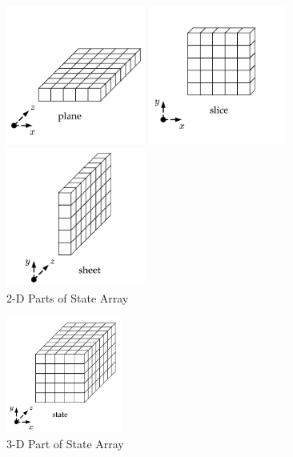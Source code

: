 \documentclass[12pt,a4paper,oneside]{report}
\begin{document}
\begin{figure}[H]
\begin{minipage}[t]{0.3\linewidth} 
\centering 
\includegraphics[width=1.8in]{imgs/2D1.png} 
\end{minipage}
\begin{minipage}[t]{0.3\linewidth} 
\centering 
\includegraphics[width=1.8in]{imgs/2D2.png} 
\end{minipage}
\begin{minipage}[t]{0.3\linewidth} 
\centering 
\includegraphics[width=1.8in]{imgs/2D3.png} 
\end{minipage}
\caption{2-D Parts of State Array} 
\end{figure}

\begin{figure}[H]
\centering
\includegraphics[width=1.5in]{imgs/3D.png}
\caption{3-D Part of State Array} 
\end{figure}
\end{document}
